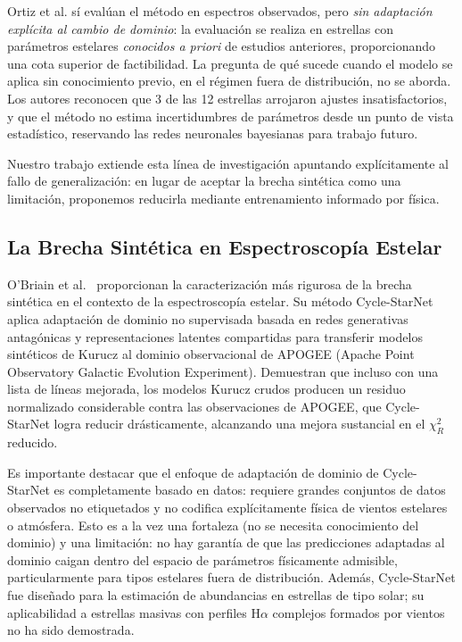 \documentclass[sigconf,ACM]{acmart}
\begin{document}
Ortiz et al. sí evalúan el método en espectros observados, pero \emph{sin adaptación explícita al cambio de dominio}: la evaluación se realiza en estrellas con parámetros estelares \emph{conocidos a priori} de estudios anteriores, proporcionando una cota superior de factibilidad. La pregunta de qué sucede cuando el modelo se aplica sin conocimiento previo, en el régimen fuera de distribución, no se aborda. Los autores reconocen que 3 de las 12 estrellas arrojaron ajustes insatisfactorios, y que el método no estima incertidumbres de parámetros desde un punto de vista estadístico, reservando las redes neuronales bayesianas para trabajo futuro.

Nuestro trabajo extiende esta línea de investigación apuntando explícitamente al fallo de generalización: en lugar de aceptar la brecha sintética como una limitación, proponemos reducirla mediante entrenamiento informado por física.

\subsection{La Brecha Sintética en Espectroscopía Estelar}

O'Briain et al.~\cite{OBriain2021} proporcionan la caracterización más rigurosa de la brecha sintética en el contexto de la espectroscopía estelar. Su método Cycle-StarNet aplica adaptación de dominio no supervisada basada en redes generativas antagónicas y representaciones latentes compartidas para transferir modelos sintéticos de Kurucz al dominio observacional de APOGEE (Apache Point Observatory Galactic Evolution Experiment). Demuestran que incluso con una lista de líneas mejorada, los modelos Kurucz crudos producen un residuo normalizado considerable contra las observaciones de APOGEE, que Cycle-StarNet logra reducir drásticamente, alcanzando una mejora sustancial en el $\chi^2_R$ reducido.

Es importante destacar que el enfoque de adaptación de dominio de Cycle-StarNet es completamente basado en datos: requiere grandes conjuntos de datos observados no etiquetados y no codifica explícitamente física de vientos estelares o atmósfera. Esto es a la vez una fortaleza (no se necesita conocimiento del dominio) y una limitación: no hay garantía de que las predicciones adaptadas al dominio caigan dentro del espacio de parámetros físicamente admisible, particularmente para tipos estelares fuera de distribución. Además, Cycle-StarNet fue diseñado para la estimación de abundancias en estrellas de tipo solar; su aplicabilidad a estrellas masivas con perfiles H$\alpha$ complejos formados por vientos no ha sido demostrada.
\end{document}
